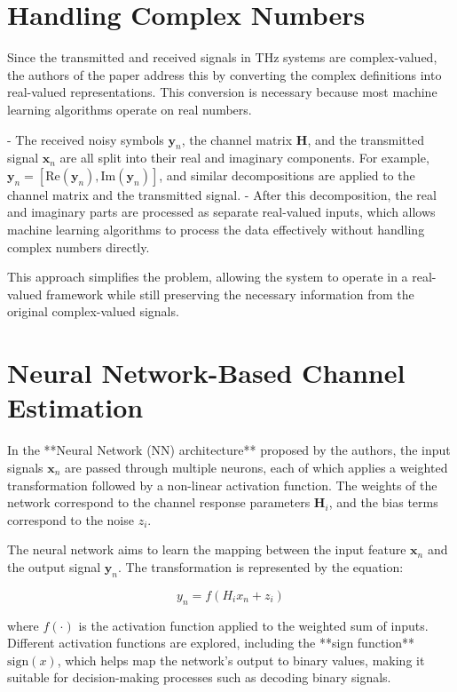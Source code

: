 \documentclass{article}
\begin{document}
\section{Handling Complex Numbers}

Since the transmitted and received signals in THz systems are complex-valued, the authors of the paper address this by converting the complex definitions into real-valued representations. This conversion is necessary because most machine learning algorithms operate on real numbers.

- The received noisy symbols \( \mathbf{y}_n \), the channel matrix \( \mathbf{H} \), and the transmitted signal \( \mathbf{x}_n \) are all split into their real and imaginary components. For example, \( \mathbf{y}_n = [\text{Re}(\mathbf{y}_n), \text{Im}(\mathbf{y}_n)] \), and similar decompositions are applied to the channel matrix and the transmitted signal.
- After this decomposition, the real and imaginary parts are processed as separate real-valued inputs, which allows machine learning algorithms to process the data effectively without handling complex numbers directly.

This approach simplifies the problem, allowing the system to operate in a real-valued framework while still preserving the necessary information from the original complex-valued signals.

\section{Neural Network-Based Channel Estimation}

In the **Neural Network (NN) architecture** proposed by the authors, the input signals \( \mathbf{x}_n \) are passed through multiple neurons, each of which applies a weighted transformation followed by a non-linear activation function. The weights of the network correspond to the channel response parameters \( \mathbf{H}_i \), and the bias terms correspond to the noise \( z_i \).

The neural network aims to learn the mapping between the input feature \( \mathbf{x}_n \) and the output signal \( \mathbf{y}_n \). The transformation is represented by the equation:

\[
y_n = f(H_i x_n + z_i)
\]

where \( f(\cdot) \) is the activation function applied to the weighted sum of inputs. Different activation functions are explored, including the **sign function** \( \text{sign}(x) \), which helps map the network's output to binary values, making it suitable for decision-making processes such as decoding binary signals.
\end{document}
